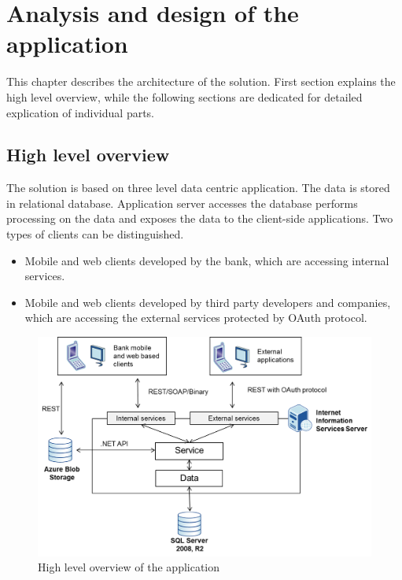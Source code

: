 \chapter{Analysis and design of the application}
This chapter describes the architecture of the solution. First section explains the high level overview, while the following sections are dedicated for detailed explication of individual parts.

\section{High level overview}
The solution is based on three level data centric application. The data is stored in relational database. Application server accesses the database performs processing on the data and exposes the data to the client-side applications. Two types of clients can be distinguished.

\begin{itemize}
	\item Mobile and web clients developed by the bank, which are accessing internal services.
	\item Mobile and web clients developed by third party developers and companies, which are accessing the external services protected by OAuth\cite{OAuth11} protocol.
\end{itemize}

\begin{figure}[h]
\begin{center}
\includegraphics[width=14cm]{figures/big_picture}
\caption{High level overview of the application}
\label{fig:high_level_overview}
\end{center}
\end{figure}

